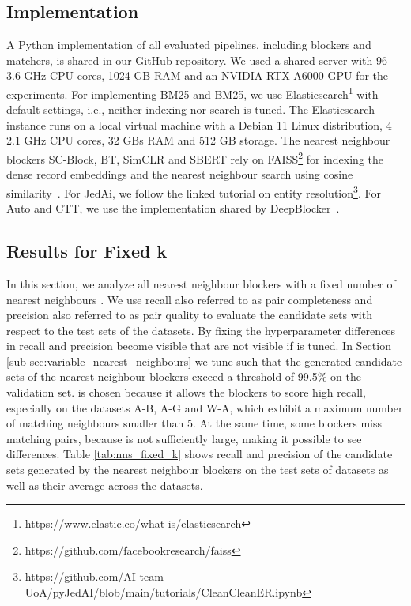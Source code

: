 \documentclass[sigconf,nonacm]{acmart}
\begin{document}
\subsection{Implementation}
\label{sub-sec:implementation}
A Python implementation of all evaluated pipelines, including blockers and matchers, is shared in our GitHub repository.
We used a shared server with 96  3.6 GHz CPU cores, 1024 GB RAM and an NVIDIA RTX A6000 GPU for the experiments.
For implementing BM25 and BM25, we use Elasticsearch\footnote{https://www.elastic.co/what-is/elasticsearch} with default settings, i.e., neither indexing nor search is tuned.
The Elasticsearch instance runs on a local virtual machine with a Debian 11 Linux distribution, 4  2.1 GHz CPU cores, 32 GBs RAM and 512 GB storage.
The nearest neighbour blockers SC-Block, BT, SimCLR and SBERT rely on FAISS\footnote{https://github.com/facebookresearch/faiss} for indexing the dense record embeddings and the nearest neighbour search using cosine similarity~\cite{johnson_billion-scale_2021}. 
For JedAi, we follow the linked tutorial on entity resolution\footnote{https://github.com/AI-team-UoA/pyJedAI/blob/main/tutorials/CleanCleanER.ipynb}. For Auto and CTT, we use the implementation shared by DeepBlocker~\cite{thirumuruganathan_deep_2021}.













\subsection{Results for Fixed k}
\label{sub-sec:fix_nearest_neighbours}

In this section, we analyze all nearest neighbour blockers with a fixed number of nearest neighbours .
We use recall also referred to as pair completeness and precision also referred to as pair quality to evaluate the candidate sets with respect to the test sets of the datasets.
By fixing the hyperparameter  differences in recall and precision become visible that are not visible if  is tuned.
In Section \ref{sub-sec:variable_nearest_neighbours} we tune  such that the generated candidate sets of the nearest neighbour blockers exceed a threshold of 99.5\% on the validation set.
 is chosen because it allows the blockers to score high recall, especially on the datasets A-B, A-G and W-A, which exhibit a maximum number of matching neighbours smaller than 5. At the same time, some blockers miss matching pairs, because  is not sufficiently large, making it possible to see differences.
Table \ref{tab:nns_fixed_k} shows recall and precision of the candidate sets generated by the nearest neighbour blockers on the test sets of datasets as well as their average across the datasets.
\end{document}
